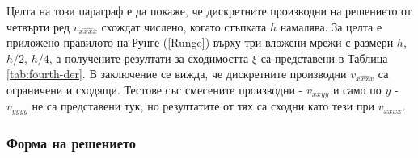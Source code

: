 \documentclass{article}
\newcommand{\rf}[1]{(\ref{#1})}
\theoremstyle{remark}
\begin{document}
\FloatBarrier
Целта на този параграф е да покаже, че дискретните производни на решението от четвърти ред $v_{\widehat{xxxx}}$ схождат числено, когато стъпката $h$ намалява. За целта е приложено правилото на Рунге \rf{Runge} върху три вложени мрежи с размери $h$, $h/2$, $h/4$, а получените резултати за сходимостта $\xi$ са представени в Таблица \ref{tab:fourth-der}. В заключение се вижда, че дискретните производни $v_{\widehat{xxxx}}$ са ограничени и сходящи. Тестове със смесените производни - $v_{xxyy}$ и само по $y$ - $v_{yyyy}$ не са представени тук, но резултатите от тях са сходни като тези при $v_{xxxx}$.

\subsubsection{Форма на решението}
\end{document}
